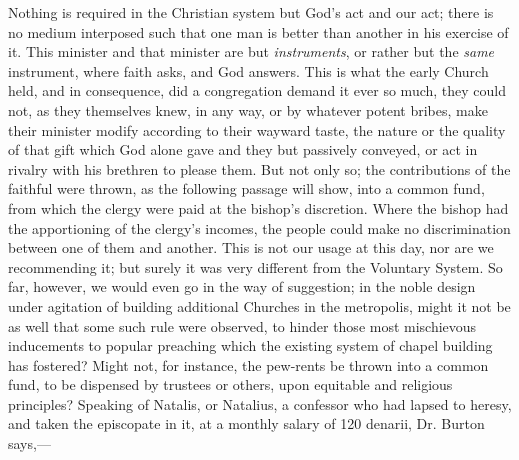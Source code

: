 Nothing is required in the Christian system but God's act and our act;
there is no medium interposed such that one man is better than another
in his exercise of it. This minister and that minister are but \emph{instruments},
or rather but the \emph{same} instrument, where faith asks, and God
answers. This is what the early Church held, and in consequence,
did a congregation demand it ever so much, they could not, as they
themselves knew, in any way, or by whatever potent bribes, make their
minister modify according to their wayward taste, the nature or the
quality of that gift which God alone gave and they but passively
conveyed, or act in rivalry with his brethren to please them. But not
only so; the contributions of the faithful were thrown, as the following
passage will show, into a common fund, from which the clergy were paid
at the bishop's discretion. Where the bishop had the apportioning of
the clergy's incomes, the people could make no discrimination between
one of them and another. This is not our usage at this day, nor are we
recommending it; but surely it was very different from the Voluntary
System. So far, however, we would even go in the way of suggestion; in
the noble design under agitation of building additional Churches in the
metropolis, might it not be as well that some such rule were observed,
to hinder those most mischievous inducements to popular preaching which
the existing system of chapel building has fostered? Might not, for
instance, the pew-rents be thrown into a common fund, to be dispensed by
trustees or others, upon equitable and religious principles? Speaking of
Natalis, or Natalius, a confessor who had lapsed to heresy, and taken
the episcopate in it, at a monthly salary of 120 denarii, Dr. Burton
says,—

